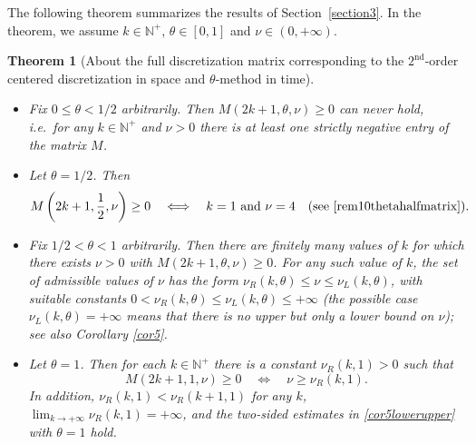 \documentclass[a4paper]{article}
\newtheorem{theorem}{Theorem}
\newcommand{\te}{\theta}
\newcommand{\nul}{\nu_L(k,\theta)}
\newcommand{\nur}{\nu_R(k,\theta)}
\newcommand{\nplus}{\mathbb{N}^+}
\begin{document}
The following theorem summarizes the results of Section~\ref{section3}.
In the theorem, we assume $k\in\nplus$, $\te\in[0,1]$ and $\nu\in(0,+\infty)$.
\begin{theorem}[About the full discretization matrix corresponding to the $2^{\text{nd}}$-order centered discretization in space and $\theta$-method in time]\label{thm2}
\begin{itemize}\ 
\item[$\bullet$] Fix $0\le\te<1/2$ arbitrarily. Then  $M(2k+1,\te,\nu)\ge 0$ can never hold, i.e.~for any $k\in\nplus$ and $\nu>0$ there is at least one strictly negative entry of the matrix $M$.
\item[$\bullet$] Let $\te=1/2$. Then
\[
M\left(2k+1,\frac{1}{2},\nu\right)\ge 0\quad\Longleftrightarrow\quad k=1\text{ and } \nu=4\quad\text{(see }\eqref{rem10thetahalfmatrix}\text{)}.
\]
\item[$\bullet$] Fix $1/2<\te<1$ arbitrarily. Then there are finitely many values of $k$ for which there exists $\nu>0$ with $M(2k+1,\te,\nu)\ge 0$. For any such value of $k$, the set of admissible values of $\nu$ has the form $\nur\le\nu\le\nul$, with suitable constants $0<\nur\le\nul\le+\infty$ (the possible case $\nul=+\infty$ means that there is no upper but only a lower bound on $\nu$); see also Corollary \ref{cor5}.
\item[$\bullet$] Let $\te=1$. Then for each $k\in\nplus$ there is a constant $\nu_R(k,1)>0$ such that
\[
M(2k+1,1,\nu)\ge 0\quad\Longleftrightarrow\quad \nu\ge\nu_R(k,1).
\]
In addition, $\nu_R(k,1)<\nu_R(k+1,1)$ for any $k$, $\lim_{k\to+\infty} \nu_R(k,1)=+\infty$, and the two-sided estimates in \eqref{cor5lowerupper} with $\te=1$ hold.
\end{itemize}
\end{theorem}
\end{document}
